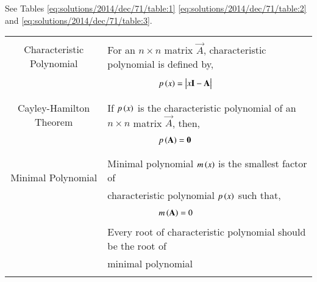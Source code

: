 See Tables \ref{eq:solutions/2014/dec/71/table:1}
\ref{eq:solutions/2014/dec/71/table:2} and 
\ref{eq:solutions/2014/dec/71/table:3}.

\begin{table*}[ht!]
\centering
\begin{tabular}{|c|l|}
    \hline
	\multirow{3}{*}{Characteristic Polynomial} 
	& \\
	& For an $n\times n$ matrix $\vec{A}$, characteristic polynomial is defined by,\\
	&\\
	& $\qquad\qquad\qquad p\brak{x}=\mydet{x\Vec{I}-\Vec{A}}$\\
	&\\
	\hline
	\multirow{3}{*}{Cayley-Hamilton Theorem}
    &\\
    & If $p\left(x\right)$ is the characteristic polynomial of an $n\times n$ matrix $\vec{A}$, then,\\
    &\\
    &$\qquad \qquad \qquad p\left(\mathbf{A}\right)=\mathbf{0}$\\
    &\\
    \hline
	\multirow{3}{*}{Minimal Polynomial} 
	&\\
	& Minimal polynomial $m\left(x\right)$ is the smallest factor of\\
	&characteristic polynomial $p\left(x\right)$ such that,\\
	&\\
	& $\qquad \qquad \qquad m\left(\mathbf{A}\right)=0$\\
	& \\
	& Every root of characteristic polynomial should be the root of\\
	&minimal polynomial\\
	&\\
    \hline
\end{tabular}
    \caption{Definitions}
\label{eq:solutions/2014/dec/71/table:1}
\end{table*}


